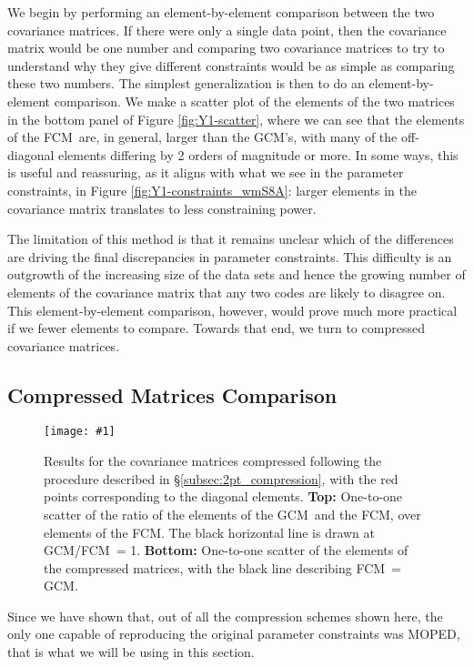 \documentclass[aps, prd, twocolumn, superscriptaddress, nofootinbib, amssymb, amsmath]{revtex4-2}
\newcommand{\sfig}[2]{
	\texttt{[image: \#1]}
}
\newcommand{\rf}[1]{Figure \ref{fig:#1}}
\newcommand{\rssec}[1]{\S\ref{subsec:#1}}
\newcommand\full{the FCM}
\newcommand\gaussian{the GCM}
\begin{document}
We begin by performing an element-by-element comparison between the two covariance matrices. If there were only a single data point, then the covariance matrix would be one number and comparing two covariance matrices to try to understand why they give different constraints would be as simple as comparing these two numbers.  The simplest generalization is then to do an element-by-element comparison. We make a scatter plot of the elements of the two matrices in the bottom panel of \rf{Y1-scatter}, where we can see that the elements of \full\ are, in general, larger than \gaussian's, with many of the off-diagonal elements differing by 2 orders of magnitude or more. In some ways, this is useful and reassuring, as it aligns with what we see in the parameter constraints, in \rf{Y1-constraints_wmS8A}: larger elements in the covariance matrix translates to less constraining power. 

The limitation of this method is that it remains unclear which of the differences are driving the final discrepancies in parameter constraints. This difficulty is an outgrowth of the increasing size of the data sets and hence the growing number of elements of the covariance matrix that any two codes are likely to disagree on. This element-by-element comparison, however, would prove much more practical if we fewer elements to compare. Towards that end, we turn to compressed covariance matrices.

\subsection{Compressed Matrices Comparison}
\label{subsec:compare_compressed}

\begin{figure}[thbp]
	\sfig{Comp2pt-scatter}{0.85\columnwidth}
	\caption{ Results for the covariance matrices compressed following the procedure described in \rssec{2pt_compression}, with the red points corresponding to the diagonal elements.
		\textbf{Top:}  One-to-one scatter of the ratio of the elements of \gaussian\ and \full, over elements of \full. The black horizontal line is drawn at GCM/FCM\ = 1.
		\textbf{Bottom:}  One-to-one scatter of the elements of the compressed matrices, with the black line describing FCM\ = GCM.}
	\label{fig:Comp2pt-scatter}
\end{figure}

Since we have shown that, out of all the compression schemes shown here, the only one capable of reproducing the original parameter constraints was MOPED, that is what we will be using in this section.
\end{document}
